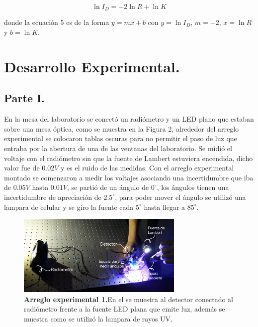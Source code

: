\documentclass[DIV=calc, paper=a4, fontsize=11pt]{scrartcl}
\begin{document}
\begin{equation}
    \ln{I_D}= -2\ln{R} + \ln{K} 
\end{equation}

donde la ecuación 5 es de la forma $y=mx+b$ con $y=\ln{I_D}$, $m=-2$, $x=\ln{R}$ y $b=\ln{K}$.


\section*{\textcolor{carmine}{Desarrollo Experimental.}}
\subsection*{\textcolor{carmine}{Parte I.}}
En la mesa del laboratorio se conectó un radiómetro y un LED plano que estaban sobre una mesa óptica, como se muestra en la Figura 2, alrededor del arreglo experimental se colocaron tablas oscuras para no permitir el paso de luz que entraba por la abertura de una de las ventanas  del laboratorio. Se midió el voltaje con el radiómetro sin que la fuente de Lambert estuviera encendida, dicho valor fue de $0.02V$ y es el ruido de las medidas. Con el arreglo experimental montado se comenzaron a medir los voltajes asociando una incertidumbre que iba de $0.05V$ hasta $0.01V$, se partió de un ángulo de $0^{\circ}$, los ángulos tienen una incertidumbre de apreciación de $2.5^{\circ}$, para poder mover el ángulo se utilizó una lampara de celular y se giro la fuente cada $5^{\circ}$ hasta llegar a $85^{\circ}$.\\
\begin{figure}[H]
    \centering
    \includegraphics[width=8cm]{Imagen/7F90E32E-999D-435F-A061-F83648BB0EDF.jpeg}
    \caption{\textbf{Arreglo experimental 1.}En el se muestra al detector conectado al radiómetro frente a la fuente LED plana que emite luz, además se muestra como se utilizó la lampara de rayos UV.}
    \label{fig:my_label}
\end{figure}
\end{document}
